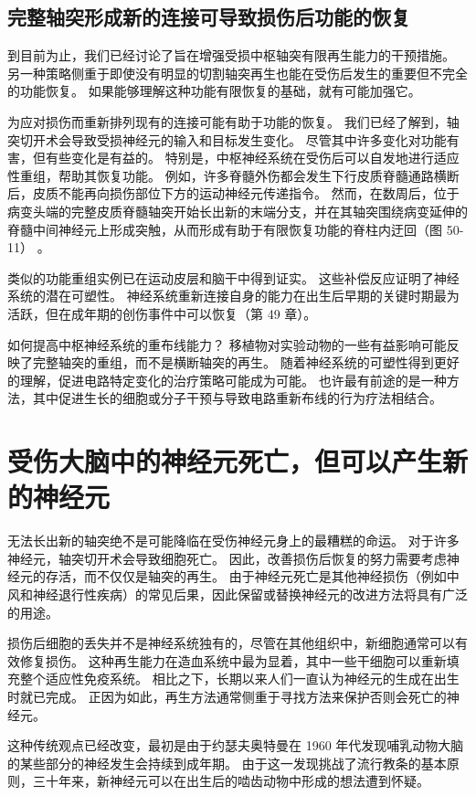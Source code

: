 \subsection{完整轴突形成新的连接可导致损伤后功能的恢复}

到目前为止，我们已经讨论了旨在增强受损中枢轴突有限再生能力的干预措施。 另一种策略侧重于即使没有明显的切割轴突再生也能在受伤后发生的重要但不完全的功能恢复。 如果能够理解这种功能有限恢复的基础，就有可能加强它。

为应对损伤而重新排列现有的连接可能有助于功能的恢复。 我们已经了解到，轴突切开术会导致受损神经元的输入和目标发生变化。 尽管其中许多变化对功能有害，但有些变化是有益的。 特别是，中枢神经系统在受伤后可以自发地进行适应性重组，帮助其恢复功能。 例如，许多脊髓外伤都会发生下行皮质脊髓通路横断后，皮质不能再向损伤部位下方的运动神经元传递指令。 然而，在数周后，位于病变头端的完整皮质脊髓轴突开始长出新的末端分支，并在其轴突围绕病变延伸的脊髓中间神经元上形成突触，从而形成有助于有限恢复功能的脊柱内迂回（图 50-11） 。

类似的功能重组实例已在运动皮层和脑干中得到证实。 这些补偿反应证明了神经系统的潜在可塑性。 神经系统重新连接自身的能力在出生后早期的关键时期最为活跃，但在成年期的创伤事件中可以恢复（第 49 章）。

如何提高中枢神经系统的重布线能力？ 移植物对实验动物的一些有益影响可能反映了完整轴突的重组，而不是横断轴突的再生。 随着神经系统的可塑性得到更好的理解，促进电路特定变化的治疗策略可能成为可能。 也许最有前途的是一种方法，其中促进生长的细胞或分子干预与导致电路重新布线的行为疗法相结合。

\section{受伤大脑中的神经元死亡，但可以产生新的神经元}

无法长出新的轴突绝不是可能降临在受伤神经元身上的最糟糕的命运。 对于许多神经元，轴突切开术会导致细胞死亡。 因此，改善损伤后恢复的努力需要考虑神经元的存活，而不仅仅是轴突的再生。 由于神经元死亡是其他神经损伤（例如中风和神经退行性疾病）的常见后果，因此保留或替换神经元的改进方法将具有广泛的用途。

损伤后细胞的丢失并不是神经系统独有的，尽管在其他组织中，新细胞通常可以有效修复损伤。 这种再生能力在造血系统中最为显着，其中一些干细胞可以重新填充整个适应性免疫系统。 相比之下，长期以来人们一直认为神经元的生成在出生时就已完成。 正因为如此，再生方法通常侧重于寻找方法来保护否则会死亡的神经元。

这种传统观点已经改变，最初是由于约瑟夫奥特曼在 1960 年代发现哺乳动物大脑的某些部分的神经发生会持续到成年期。 由于这一发现挑战了流行教条的基本原则，三十年来，新神经元可以在出生后的啮齿动物中形成的想法遭到怀疑。

